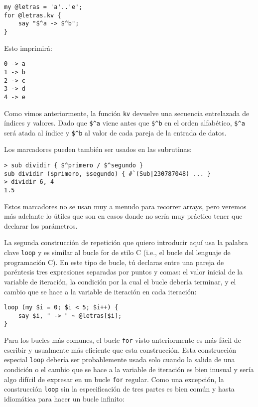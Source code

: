 \begin{verbatim}
my @letras = 'a'..'e';
for @letras.kv { 
    say "$^a -> $^b"; 
}
\end{verbatim}
%
Esto imprimirá:
\begin{verbatim}
0 -> a
1 -> b
2 -> c
3 -> d
4 -> e
\end{verbatim}
%

Como vimos anteriormente, la función {\tt kv} devuelve
una secuencia entrelazada de índices y valores. Dado
que \verb|$^a| viene antes que \verb|$^b| en el orden
alfabético, \verb|$^a| será atada al índice y \verb|$^b|
al valor de cada pareja de la entrada de datos.

Los marcadores pueden también ser usados en las
subrutinas:

\begin{verbatim}
> sub dividir { $^primero / $^segundo }
sub dividir ($primero, $segundo) { #`(Sub|230787048) ... }
> dividir 6, 4
1.5
\end{verbatim}
%

Estos marcadores no se usan muy a menudo para recorrer arrays,
pero veremos más adelante lo útiles
que son en casos donde no sería muy práctico tener que declarar los
parámetros.

\label{C-style loop}
La segunda construcción de repetición que quiero introducir
aquí usa la palabra clave {\tt loop} y es similar
al bucle for de stilo C (i.e., el bucle del lenguaje
de programación C). En este tipo de bucle, tú declaras
entre una pareja de paréntesis tres expresiones separadas
por puntos y comas: el valor inicial de la variable de iteración,
la condición por la cual el bucle debería terminar, y el cambio
que se hace a la variable de iteración en cada iteración:

\begin{verbatim}
loop (my $i = 0; $i < 5; $i++) {
    say $i, " -> " ~ @letras[$i];
}
\end{verbatim}
%
Para los bucles más comunes, el bucle {\tt for} visto anteriormente
es más fácil de escribir y usualmente más eficiente que esta
construcción. Esta construcción especial {\tt loop} debería 
ser probablemente usada solo cuando la salida de una condición
o el cambio que se hace a la variable de iteración es bien inusual
y sería algo difícil de expresar en un bucle {\tt for} regular. 
Como una excepción, la construcción {\tt loop} sin la especificación
de tres partes es bien común  y hasta idiomática para hacer un bucle
infinito:

